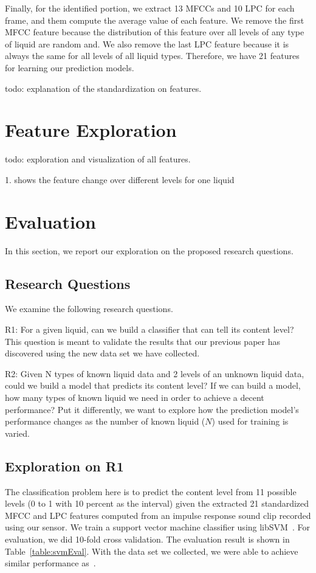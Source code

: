 \documentclass{article} %
\begin{document}
Finally, for the identified portion, we extract 13 MFCCs and 10 LPC for each frame, and them compute the average value of each feature. We remove the first MFCC feature because the distribution of this feature over all levels of any type of liquid are random and. We also remove the last LPC feature because it is always the same for all levels of all liquid types. Therefore, we have 21 features for learning our prediction models.

todo: explanation of the standardization on features.

\section{Feature Exploration}
todo: exploration and visualization of all features.

1. shows the feature change over different levels for one liquid


\section{Evaluation}
In this section, we report our exploration on the proposed research questions.

\subsection{Research Questions}
We examine the following research questions.

R1: For a given liquid, can we build a classifier that can tell its content level? This question is meant to validate the results that our previous paper has discovered using the new data set we have collected.

R2: Given N types of known liquid data and 2 levels of an unknown liquid data, could we build a model that predicts its content level? If we can build a model, how many types of known liquid we need in order to achieve a decent performance? Put it differently, we want to explore how the prediction model's performance changes as the number of known liquid ($N$) used for training is varied.

\subsection{Exploration on R1}
The classification problem here is to predict the content level from 11 possible levels (0 to 1 with 10 percent as the interval) given the extracted 21 standardized MFCC and LPC features computed from an impulse response sound clip recorded using our sensor. We train a support vector machine classifier using libSVM~\cite{chang2011libsvm}. For evaluation, we did 10-fold cross validation. The evaluation result is shown in Table~\ref{table:svmEval}. With the data set we collected, we were able to achieve similar performance as~\cite{fan2015soqr}.
\end{document}
